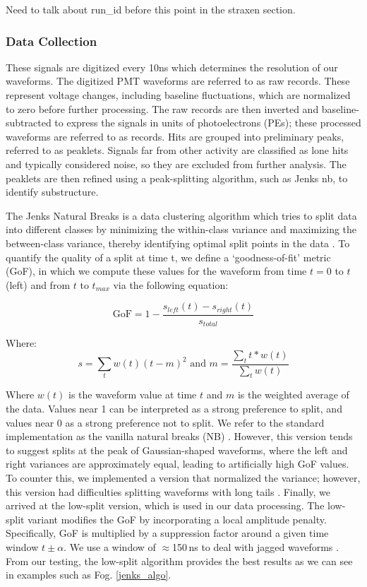 Need to talk about run\_id before this point in the straxen section.

\subsubsection*{Data Collection}

These signals are digitized every 10ns which determines the resolution of our waveforms. The digitized PMT waveforms are referred to as raw records. These represent voltage changes, including baseline fluctuations, which are normalized to zero before further processing. The raw records are then inverted and baseline-subtracted to express the signals in units of photoelectrons (PEs); these processed waveforms are referred to as records. Hits are grouped into preliminary peaks, referred to as peaklets. Signals far from other activity are classified as lone hits and typically considered noise, so they are excluded from further analysis. The peaklets are then refined using a peak-splitting algorithm, such as Jenks \acrfull{nb}, to identify substructure.


The Jenks Natural Breaks is a data clustering algorithm which tries to split data into different classes by minimizing the within-class variance and maximizing the between-class variance, thereby identifying optimal split points in the data \cite{jenks1967model}. To quantify the quality of a split at time t, we define a ‘goodness-of-fit’ metric (GoF), in which we compute these values for the waveform from time $t = 0$ to $t$ (left) and from $t$ to $t_{max}$ via the following equation:

$$ \text{GoF}= 1 - \frac{s_{left}(t) - s_{right}(t)}{s_{total}}$$

Where:
$$s = \sum_tw(t)(t-m)^2 \text{ and } m=  \frac{\sum_tt*w(t)}{\sum_tw(t)}$$

Where $w(t)$ is the waveform value at time $t$ and $m$ is the weighted average of the data. Values near 1 can be interpreted as a strong preference to split, and values near 0 as a strong preference not to split. We refer to the standard implementation as the vanilla natural breaks (NB) \cite{jenks1967model}. However, this version tends to suggest splits at the peak of Gaussian-shaped waveforms, where the left and right variances are approximately equal, leading to artificially high GoF values. To counter this, we implemented a version that normalized the variance; however, this version had difficulties splitting waveforms with long tails \cite{Larkin1979AnAF}. Finally, we arrived at the low-split version, which is used in our data processing. The low-split variant modifies the GoF by incorporating a local amplitude penalty. Specifically, GoF is multiplied by a suppression factor around a given time window $t \pm \alpha$. We use a window of $\approx$150\,ns to deal with jagged waveforms \cite{githubPRstrax225}. From our testing, the low-split algorithm provides the best results as we can see in examples such as Fog. \ref{jenks_algo}.

